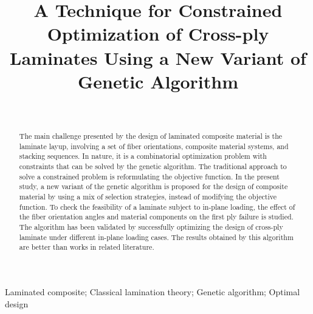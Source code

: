 \documentclass[10pt, journal]{IEEEtran}
\begin{document}
\title{A Technique for Constrained Optimization of Cross-ply Laminates Using a New Variant of Genetic Algorithm}


\author{\\
}



\maketitle

\begin{abstract}
	The main challenge presented by the design of laminated composite material
	is the laminate layup, involving a set of fiber orientations, composite
	material systems, and stacking sequences. In nature, it is a combinatorial
	optimization problem with constraints that can be solved by the genetic
	algorithm. The traditional approach to solve a constrained problem is
	reformulating the objective function. In the present study, a new variant of
	the genetic algorithm is proposed for the design of composite material by
	using a mix of selection strategies, instead of modifying the objective
	function.  To check the feasibility of a laminate subject to in-plane
	loading, the effect of the fiber orientation angles and material components
	on the first ply failure is studied. The algorithm has been validated by
	successfully optimizing the design of cross-ply laminate under different
	in-plane loading cases. The results obtained
	by this algorithm are better than works in related literature.
\end{abstract}

\begin{IEEEkeywords}
Laminated composite; Classical lamination theory; Genetic algorithm; Optimal design
\end{IEEEkeywords}


\IEEEpeerreviewmaketitle
\end{document}
